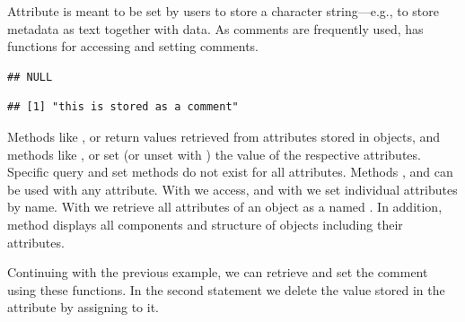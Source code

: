 \documentclass[krantz2]{krantz}\usepackage{knitr}
\begin{document}
Attribute  is meant to be set by users to store a character string---e.g., to store metadata as text together with data. As comments are frequently used, \Rlang has functions for accessing and setting comments. 

\begin{knitrout}\footnotesize
{}\color{fgcolor}\begin{kframe}
\begin{alltt}
 \hlkwb{<-} \hlstd{(} \hlstd{=} \hlopt{:}\hlstd{,}  \hlstd{=} \hlstd{,}  \hlstd{=} \hlstd{(}\hlstd{,} \hlstd{))}
\end{alltt}
\begin{verbatim}
## NULL
\end{verbatim}
\begin{alltt}
 \hlkwb{<-} 
\end{alltt}
\begin{verbatim}
## [1] "this is stored as a comment"
\end{verbatim}
\end{kframe}
\end{knitrout}

Methods like ,  or  return values retrieved from attributes stored in \Rlang objects, and methods like ,  or  set (or unset with ) the value of the respective attributes. Specific query and set methods do not exist for all attributes. Methods ,  and  can be used with any attribute. With  we access, and with   we set individual attributes by name. With  we retrieve all attributes of an object as a named . In addition, method  displays all components and structure of \Rlang objects including their attributes.

Continuing with the previous example, we can retrieve and set the comment using these functions. In the second statement we delete the value stored in the  attribute by assigning  to it.
\end{document}
